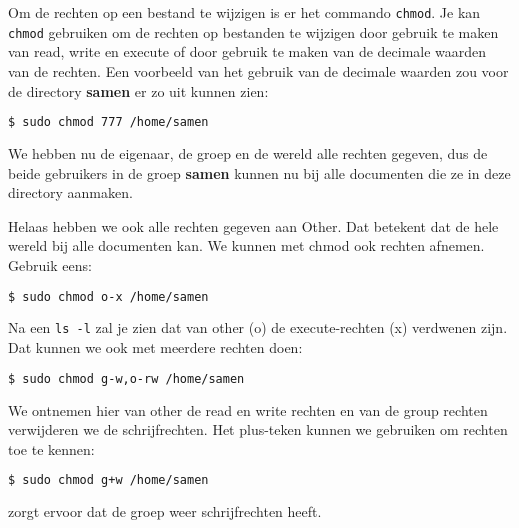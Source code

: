 Om de rechten op een bestand te wijzigen is er het commando \texttt{chmod}. Je kan \texttt{chmod} gebruiken om de rechten op bestanden te wijzigen door gebruik te maken van read, write en execute of door gebruik te maken van de decimale waarden van de rechten. Een voorbeeld van het gebruik van de decimale waarden zou voor de directory \textbf{samen} er zo uit kunnen zien:
\begin{lstlisting}[language=bash]
$ sudo chmod 777 /home/samen
\end{lstlisting}
We hebben nu de eigenaar, de groep en de wereld alle rechten gegeven, dus de beide gebruikers in de groep \textbf{samen} kunnen nu bij alle documenten die ze in deze directory aanmaken.

Helaas hebben we ook alle rechten gegeven aan Other. Dat betekent dat de hele wereld bij alle documenten kan. We kunnen met chmod ook rechten afnemen. Gebruik eens:
\begin{lstlisting}[language=bash]
$ sudo chmod o-x /home/samen
\end{lstlisting}
Na een \texttt{ls -l} zal je zien dat van other (o) de execute-rechten (x) verdwenen zijn. Dat kunnen we ook met meerdere rechten doen:
\begin{lstlisting}[language=bash]
$ sudo chmod g-w,o-rw /home/samen
\end{lstlisting}
We ontnemen hier van other de read en write rechten en van de group rechten verwijderen we de schrijfrechten. Het plus-teken kunnen we gebruiken om rechten toe te kennen:
\begin{lstlisting}[language=bash]
$ sudo chmod g+w /home/samen
\end{lstlisting}
zorgt ervoor dat de groep weer schrijfrechten heeft.
